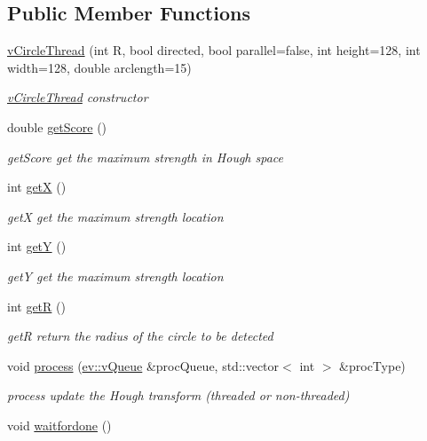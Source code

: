 \subsection*{Public Member Functions}
\begin{DoxyCompactItemize}
\item 
\hyperlink{classvCircleThread_adb0ce9432b9fe2a8d853c63b764d7859}{v\+Circle\+Thread} (int R, bool directed, bool parallel=false, int height=128, int width=128, double arclength=15)
\begin{DoxyCompactList}\small\item\em \hyperlink{classvCircleThread}{v\+Circle\+Thread} constructor \end{DoxyCompactList}\item 
double \hyperlink{classvCircleThread_a692a1066ee63c2716998fcb3a7aa513d}{get\+Score} ()
\begin{DoxyCompactList}\small\item\em get\+Score get the maximum strength in Hough space \end{DoxyCompactList}\item 
int \hyperlink{classvCircleThread_a0feac9f937bfeecc2dc0b015f9e8161c}{getX} ()
\begin{DoxyCompactList}\small\item\em getX get the maximum strength location \end{DoxyCompactList}\item 
int \hyperlink{classvCircleThread_a4f39898c53c3178b84b28c8cc33ec352}{getY} ()
\begin{DoxyCompactList}\small\item\em getY get the maximum strength location \end{DoxyCompactList}\item 
int \hyperlink{classvCircleThread_a024aa1ad0a7855fad146425c80feadb0}{getR} ()
\begin{DoxyCompactList}\small\item\em getR return the radius of the circle to be detected \end{DoxyCompactList}\item 
void \hyperlink{classvCircleThread_ad5f114e5609dd616c9eae9d1755d12c1}{process} (\hyperlink{classev_1_1vQueue}{ev\+::v\+Queue} \&proc\+Queue, std\+::vector$<$ int $>$ \&proc\+Type)
\begin{DoxyCompactList}\small\item\em process update the Hough transform (threaded or non-\/threaded) \end{DoxyCompactList}\item 
void \hyperlink{classvCircleThread_a0d32749f12d2d93ff0d9ccdf37422ccf}{waitfordone} ()\hypertarget{classvCircleThread_a0d32749f12d2d93ff0d9ccdf37422ccf}{}\label{classvCircleThread_a0d32749f12d2d93ff0d9ccdf37422ccf}


\end{DoxyCompactItemize}

